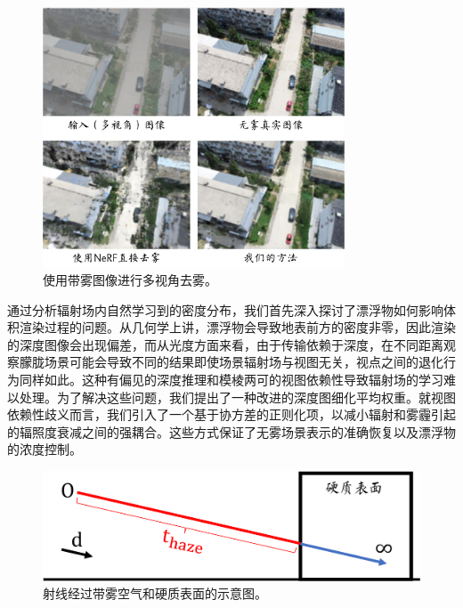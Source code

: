 \begin{figure}[ht]
    \centering
    \includegraphics[width=0.8\textwidth]{undergraduate-thesis/images/dehazing-nerf/teaser.pdf}
    \caption{使用带雾图像进行多视角去雾。}
    \label{fig:dehazing-nerf teaser}
\end{figure}

通过分析辐射场内自然学习到的密度分布，我们首先深入探讨了漂浮物如何影响体积渲染过程的问题。从几何学上讲，漂浮物会导致地表前方的密度非零，因此渲染的深度图像会出现偏差，而从光度方面来看，由于传输依赖于深度，在不同距离观察朦胧场景可能会导致不同的结果即使场景辐射场与视图无关，视点之间的退化行为同样如此。这种有偏见的深度推理和模棱两可的视图依赖性导致辐射场的学习难以处理。为了解决这些问题，我们提出了一种改进的深度图细化平均权重。就视图依赖性歧义而言，我们引入了一个基于协方差的正则化项，以减小辐射和雾霾引起的辐照度衰减之间的强耦合。这些方式保证了无雾场景表示的准确恢复以及漂浮物的浓度控制。

\begin{figure}[ht]
    \centering
    \includegraphics[width=\textwidth]{undergraduate-thesis/images/dehazing-nerf/t-haze.pdf}
    \caption{射线经过带雾空气和硬质表面的示意图。}
    \label{fig:dehazing-nerf t-haze decomposition}
\end{figure}


